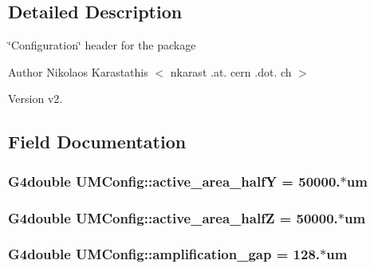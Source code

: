 \subsection{Detailed Description}
\char`\"{}\+Configuration\char`\"{} header for the package

\begin{DoxyAuthor}{Author}
Nikolaos Karastathis $<$ nkarast .at. cern .dot. ch $>$ 
\end{DoxyAuthor}
\begin{DoxyVersion}{Version}
v2. 
\end{DoxyVersion}


\subsection{Field Documentation}
\hypertarget{structUMConfig_a5f1596eab9aa3565950c73754dda39cb}{}
\subsubsection[{active\+\_\+area\+\_\+half\+Y}]{\setlength{\rightskip}{0pt plus 5cm}G4double U\+M\+Config\+::active\+\_\+area\+\_\+half\+Y = 50000.$\ast$um}\label{structUMConfig_a5f1596eab9aa3565950c73754dda39cb}
\hypertarget{structUMConfig_aa2d3a8ec4fbc8426464a7894a162be39}{}
\subsubsection[{active\+\_\+area\+\_\+half\+Z}]{\setlength{\rightskip}{0pt plus 5cm}G4double U\+M\+Config\+::active\+\_\+area\+\_\+half\+Z = 50000.$\ast$um}\label{structUMConfig_aa2d3a8ec4fbc8426464a7894a162be39}
\hypertarget{structUMConfig_abd2d64e07e405d5274f562ba81dca4ae}{}
\subsubsection[{amplification\+\_\+gap}]{\setlength{\rightskip}{0pt plus 5cm}G4double U\+M\+Config\+::amplification\+\_\+gap = 128.$\ast$um}\label{structUMConfig_abd2d64e07e405d5274f562ba81dca4ae}
\hypertarget{structUMConfig_a31dc39c8cb1cfdbaa648723dcd04a583}{}
